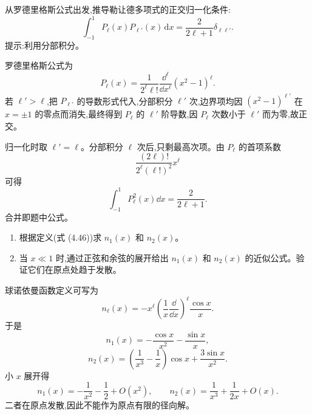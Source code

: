 \begin{question}
从罗德里格斯公式出发,推导勒让德多项式的正交归一化条件:
\[
\int_{-1}^{1}P_\ell(x)P_{\ell'}(x)\,\mathrm dx=\frac{2}{2\ell+1}\delta_{\ell\ell'}.
\]
提示:利用分部积分。
\end{question}
\begin{solution}

罗德里格斯公式为
\[
P_\ell(x)=\frac{1}{2^\ell\ell!}\frac{\dd^\ell}{\dd x^\ell}(x^2-1)^\ell.
\]
若 $\ell'>\ell$,把 $P_{\ell'}$ 的导数形式代入,分部积分 $\ell'$ 次,边界项均因 $(x^2-1)^{\ell'}$ 在 $x=\pm1$ 的零点而消失,最终得到 $P_\ell$ 的 $\ell'$ 阶导数,因 $P_\ell$ 次数小于 $\ell'$ 而为零,故正交。

归一化时取 $\ell'=
\ell$。分部积分 $\ell$ 次后,只剩最高次项。由 $P_\ell$ 的首项系数
\[
\frac{(2\ell)!}{2^\ell(\ell!)^2}x^\ell
\]
可得
\[
\int_{-1}^1P_\ell^2(x)\dd x=\frac{2}{2\ell+1}.
\]
合并即题中公式。

\end{solution}

\begin{question}
\begin{enumerate}
\item 根据定义(式 (4.46))求 $n_1(x)$ 和 $n_2(x)$。
\item 当 $x\ll1$ 时,通过正弦和余弦的展开给出 $n_1(x)$ 和 $n_2(x)$ 的近似公式。验证它们在原点处趋于发散。
\end{enumerate}

\par\smallskip
{}

\end{question}
\begin{solution}

球诺依曼函数定义可写为
\[
n_\ell(x)=-x^\ell\left(\frac{1}{x}\frac{\dd}{\dd x}\right)^\ell\frac{\cos x}{x}.
\]
于是
\[
n_1(x)=-\frac{\cos x}{x^2}-\frac{\sin x}{x},
\]
\[
n_2(x)=\left(\frac{1}{x^3}-\frac{1}{x}\right)\cos x+\frac{3\sin x}{x^2}.
\]
小 $x$ 展开得
\[
n_1(x)=-\frac1{x^2}-\frac12+O(x^2),
\qquad
n_2(x)=\frac{1}{x^3}+\frac{1}{2x}+O(x).
\]
二者在原点发散,因此不能作为原点有限的径向解。

\end{solution}


